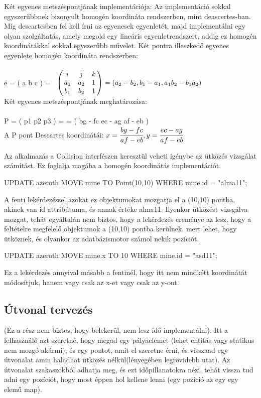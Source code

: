\begin{sql}
Két egyenes metszéspontjának implementációja: Az implementáció sokkal egyszer\H ubbnek bizonyult homogén koordináta rendszerben, mint deascertes-ban. Míg descartesben fel kell írni az egyenesek egyenletét, majd implementálni egy olyan szolgáltatás, amely megold egy lineáris egyenletrendszert, addig ez homogén koordinátákkal sokkal egyszer\H ubb m\H uvelet.
Két pontra illeszked\H o egyenes egyenlete homogén koordináta rendszerben: 
\\
e = ( a b c ) =$ \bordermatrix{~ &  &  &  \cr
	& i & j & k\cr
	& a_1 & a_2 & 1\cr
	& b_1 & b_2 & 1\cr} = ( a_2 - b_2 , b_1 - a_1 , a_1b_2 - b_1a_2 )$
\\
Két egyenes metszéspontjának meghatározása:\\
\\
P = ( p1 p2 p3 ) =  = ( bg - fc  ec - ag  af - eb )
\\
A P pont Descartes koordinátái:
$ x = \cfrac{bg - fc}{af - eb} , y = \cfrac{ec - ag}{af - eb}$
\cite{Banya5}


Az alkalmazás a Collision interfészen keresztül veheti igénybe az ütközés vizsgálat számítást. Ez foglalja magába a homogén koordinátás implementációt.

\begin{sql}
UPDATE azeroth MOVE  mine TO Point(10,10) WHERE mine.id = "alma11"; 
\end{sql}
A fenti lekérdezéssel azokat ez objektumokat mozgatja el a (10,10) pontba, akinek van id attribútuma, és annak értéke alma11. Ilyenkor ütközést vizsgálva mozgat, tehát egyáltalán nem biztos, hogy a lekérdezés ereménye az lesz, hogy a feltételre megfelelő objektumok a (10,10) pontba kerülnek, mert lehet, hogy ütköznek, és olyankor az adatbázismotor számol nekik pozíciót.
\begin{sql}
UPDATE azeroth MOVE  mine.x TO 10 WHERE mine.id = "asd11"; 
\end{sql}
Ez a lekérdezés annyival másabb a fentinél, hogy itt nem mindkétt koordinátát módosítjuk, hanem vagy csak az x-et vagy csak az y-ont.

\subsection{Útvonal tervezés}

(Ez a rész nem biztos, hogy belekerül, nem lesz idő implementálni). Itt a felhasználó azt szeretné, hogy megad egy pályaelemet (lehet entitás vagy statikus nem mozgó akármi), és egy pontot, amit el szeretne érni, és visszaad egy útvonalat amin haladhat ütközés nélkül(lényegében legrövidebb utat). Az útvonalat szakaszokból adhatja meg, és ezt időpillanatokra nézi, tehát vissza tud adni egy pozíciót, hogy most éppen hol kellene lenni (egy pozíció az egy egy elemű map).


\end{sql}
